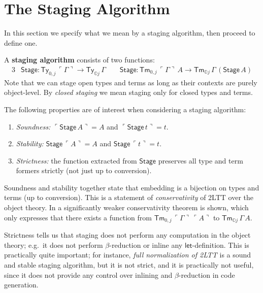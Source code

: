 \documentclass[acmsmall,review]{acmart}
\newcommand{\msf}[1]{\mathsf{#1}}
\newcommand{\mbb}[1]{\mathbb{#1}}
\newcommand{\mbbo}{\mbb{O}}
\newcommand{\Ty}{\msf{Ty}}
\newcommand{\Tm}{\msf{Tm}}
\newcommand{\emb}[1]{\ulcorner#1\urcorner}
\newcommand{\Stage}{\msf{Stage}}
\theoremstyle{remark}
\begin{document}
\section{The Staging Algorithm}\label{sec:staging-algorithm}

In this section we specify what we mean by a staging algorithm, then proceed to
define one.

\begin{definition}\label{def:staging}
A \textbf{staging algorithm} consists of two functions:
  \begin{alignat*}{3}
    & \Stage : \Ty_{0,j}\,\emb{\Gamma} \to \Ty_{\mbbo j}\,\Gamma\hspace{2em} \Stage : \Tm_{0,j}\,\emb{\Gamma}\,A \to \Tm_{\mbbo j}\,\Gamma\,(\Stage\,A)
  \end{alignat*}
Note that we can stage open types and terms as long as their contexts are purely
object-level. By \emph{closed staging} we mean staging only for closed types and
terms.
\end{definition}
\begin{definition}
  The following properties are of interest when considering a staging algorithm:
  \begin{enumerate}
  \item \emph{Soundness:} $\emb{\Stage\,A} = A$ and $\emb{\Stage\,t} = t$.
  \item \emph{Stability:} $\Stage\,\emb{A} = A$ and $\Stage\,\emb{t} = t$.
  \item \emph{Strictness:} the function extracted from $\Stage$ preserves all
    type and term formers strictly (not just up to conversion).
  \end{enumerate}
\end{definition}

Soundness and stability together state that embedding is a bijection
on types and terms (up to conversion). This is a statement of
\emph{conservativity} of 2LTT over the object theory. In \cite{twolevel} a
significantly weaker conservativity theorem is shown, which only expresses that
there exists a function from $\Tm_{0,j}\,\emb{\Gamma}\,\emb{A}$ to $\Tm_{\mbbo
  j}\,\Gamma\,A$.

Strictness tells us that staging does not perform any computation in the
object theory; e.g.\ it does not perform $\beta$-reduction or inline any
$\msf{let}$-definition. This is practically quite important; for instance,
\emph{full normalization of 2LTT} is a sound and stable staging algorithm, but
it is not strict, and it is practically not useful, since it does not
provide any control over inlining and $\beta$-reduction in code generation.
\end{document}
